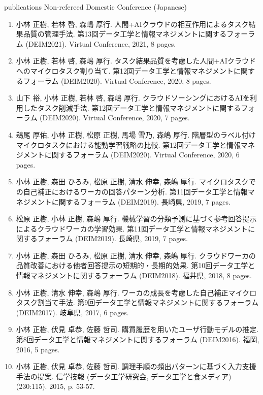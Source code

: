 \documentclass{resume} %
\begin{document}
\begin{rSection}{publications}
Non-refereed Domestic Conference (Japanese)
\begin{enumerate}
  \setcounter{enumi}{0}
  \item 小林 正樹, 若林 啓, 森嶋 厚行. 人間+AIクラウドの相互作用によるタスク結果品質の管理手法. 第13回データ工学と情報マネジメントに関するフォーラム (DEIM2021). Virtual Conference, 2021, 8 pages.
  \item 小林 正樹, 若林 啓, 森嶋 厚行. タスク結果品質を考慮した人間+AIクラウドへのマイクロタスク割り当て. 第12回データ工学と情報マネジメントに関するフォーラム (DEIM2020). Virtual Conference, 2020, 8 pages.
  \item 山下 裕, 小林 正樹, 若林 啓, 森嶋 厚行. クラウドソーシングにおけるAIを利用したタスク削減手法. 第12回データ工学と情報マネジメントに関するフォーラム (DEIM2020). Virtual Conference, 2020, 7 pages.
  \item 鵜尾 厚佑, 小林 正樹, 松原 正樹, 馬場 雪乃, 森嶋 厚行. 階層型のラベル付けマイクロタスクにおける能動学習戦略の比較. 第12回データ工学と情報マネジメントに関するフォーラム (DEIM2020). Virtual Conference, 2020, 6 pages.
  \item 小林 正樹, 森田 ひろみ, 松原 正樹, 清水 伸幸, 森嶋 厚行. マイクロタスクでの自己補正におけるワーカの回答パターン分析. 第11回データ工学と情報マネジメントに関するフォーラム (DEIM2019). 長崎県, 2019, 7 pages.
  \item 松原 正樹, 小林 正樹, 森嶋 厚行. 機械学習の分類予測に基づく参考回答提示によるクラウドワーカの学習効果. 第11回データ工学と情報マネジメントに関するフォーラム (DEIM2019). 長崎県, 2019, 7 pages.
  \item 小林 正樹, 森田 ひろみ, 松原 正樹, 清水 伸幸, 森嶋 厚行. クラウドワーカの品質改善における他者回答提示の短期的・長期的効果. 第10回データ工学と情報マネジメントに関するフォーラム (DEIM2018). 福井県, 2018, 8 pages.
  \item 小林 正樹, 清水 伸幸, 森嶋 厚行. ワーカの成長を考慮した自己補正マイクロタスク割当て手法. 第9回データ工学と情報マネジメントに関するフォーラム (DEIM2017). 岐阜県, 2017, 6 pages.
  \item 小林 正樹, 伏見 卓恭, 佐藤 哲司. 購買履歴を用いたユーザ行動モデルの推定. 第8回データ工学と情報マネジメントに関するフォーラム (DEIM2016). 福岡, 2016, 5 pages.
  \item 小林 正樹, 伏見 卓恭, 佐藤 哲司. 調理手順の頻出パターンに基づく入力支援手法の提案. 信学技報 (データ工学研究会, データ工学と食メディア) (230:115). 2015, p. 53-57.
\end{enumerate}


\end{rSection}
\end{document}
